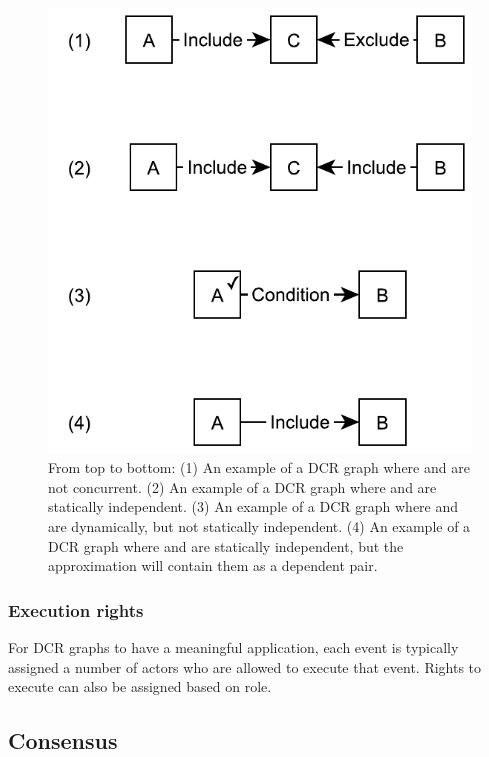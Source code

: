 \documentclass{article}
\begin{document}
		\begin{figure}[!ht]
			\center
			\includegraphics[scale=0.6]{figures/dcr-graphs/concurrency-all.pdf}
			\caption{From top to bottom:
			(1) An example of a DCR graph where  and  are not concurrent.
			(2) An example of a DCR graph where  and  are statically independent.
			(3) An example of a DCR graph where  and  are dynamically, but not statically independent.
			(4) An example of a DCR graph where  and  are statically independent, but the approximation will contain them as a dependent pair\label{fig:concurrency-all}.}
		\end{figure}

			\subsubsection{Execution rights}

			For DCR graphs to have a meaningful application, each event is typically assigned a number of actors who are allowed to execute that event.
			Rights to execute can also be assigned based on role.

		\subsection{Consensus}
		\label{subsec:consensus}
\end{document}
